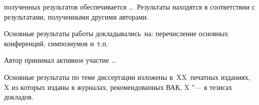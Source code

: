 {\reliability} полученных результатов обеспечивается \ldots \ Результаты находятся в соответствии с результатами, полученными другими авторами.


{\probation}
Основные результаты работы докладывались~на:
перечисление основных конференций, симпозиумов и~т.\:п.

{\contribution} Автор принимал активное участие \ldots

{%
    {\publications} Основные результаты по теме диссертации изложены
    в~XX~печатных изданиях,
    X из которых изданы в журналах, рекомендованных ВАК,
    X "--- в тезисах докладов.
}%
{%
 \begin{refsection}


\end{refsection}}
